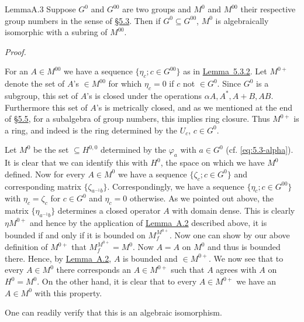 \documentclass[b5paper,twoside]{article}
\newcommand{\secref}[2]{\hyperref[#1]{\mbox{\S#2}}}
\newcommand{\lemref}[2]{\hyperref[#1]{\mbox{Lemma~#2}}}
\theoremstyle{mvnplain}
\renewenvironment{proof}[1][Proof]{%
  \par\addvspace{0.35\baselineskip}%
  \noindent\textit{#1.}\ \normalfont\ignorespaces
}{%
  \par\addvspace{0.35\baselineskip}%
}
\newcommand{\M}{\mathbf M}
\newcommand{\Hilbert}{\mathfrak H}
\def\M{M}%
\def\Hilbert{H}%
\def\widetilde#1{#1}%
\def\mathfrak#1{#1}%
\begin{document}
\begin{namedstatement}{Lemma}{A.3}\label{lem:A.3}
Suppose $\mathfrak G^0$ and $\mathfrak G^{00}$ are two groups and $\M^0$ and
$\M^{00}$ their respective group numbers in the sense of
\secref{sec:5.3}{5.3}. Then if $\mathfrak G^0\subseteq\mathfrak G^{00}$,
$\M^0$ is algebraically isomorphic with a subring of $\M^{00}$.
\end{namedstatement}

\begin{proof}
For an $A\in\M^{00}$ we have a sequence
$\{\eta_c;c\in\mathfrak G^{00}\}$ as in \lemref{lem:5.3.2}{5.3.2}. Let
$\M^{0+}$ denote the set of $A$'s $\in\M^{00}$ for which $\eta_c=0$ if $c$
not $\in\mathfrak G^0$. Since $\mathfrak G^0$ is a subgroup, this set of
$A$'s is closed under the operations $\alpha A,A^*,A+B,AB$. Furthermore this
set of $A$'s is metrically closed, and as we mentioned at the end of
\secref{sec:5.5}{5.5}, for a subalgebra of group numbers, this implies ring
closure. Thus $\M^{0+}$ is a ring, and indeed is the ring determined by the
$U_c$, $c\in\mathfrak G^0$.

Let $\mathfrak M^0$ be the set $\subseteq\Hilbert^{0,0}$ determined by the
$\varphi_a$ with $a\in\mathfrak G^0$ (cf. \eqref{eq:5.3-alpha}). It is clear that we
can identify this with $\Hilbert^0$, the space on which we have $\M^0$
defined. Now for every $A\in\M^0$ we have a sequence
$\{\zeta_c;c\in\mathfrak G^0\}$ and corresponding matrix
$\{\zeta_{a^{-1}b}\}$. Correspondingly, we have a sequence
$\{\eta_c;c\in\mathfrak G^{00}\}$ with $\eta_c=\zeta_c$ for
$c\in\mathfrak G^0$ and $\eta_c=0$ otherwise. As we pointed out above, the
matrix $\{\eta_{a^{-1}b}\}$ determines a closed operator $\widetilde A$ with
domain dense. This is clearly $\mathbin{\eta}\M^{0+}$ and hence by the
application of \lemref{lem:A.2}{A.2} described above, it is bounded if and
only if it is bounded on $\mathfrak M_f^{\M^{0+}}$. Now one can show by our
above definition of $\M^{0+}$ that
$\mathfrak M_f^{\M^{0+}}=\mathfrak M^0$. Now $\widetilde A=A$ on
$\mathfrak M^0$ and thus is bounded there. Hence, by \lemref{lem:A.2}{A.2},
$\widetilde A$ is bounded and $\in\M^{0+}$. We now see that to every
$A\in\M^0$ there corresponds an $\widetilde A\in\M^{0+}$ such that
$\widetilde A$ agrees with $A$ on $\Hilbert^0=\mathfrak M^0$. On the other
hand, it is clear that to every $\widetilde A\in\M^{0+}$ we have an
$A\in\M^0$ with this property.

One can readily verify that this is an algebraic isomorphism.
\end{proof}
\end{document}
